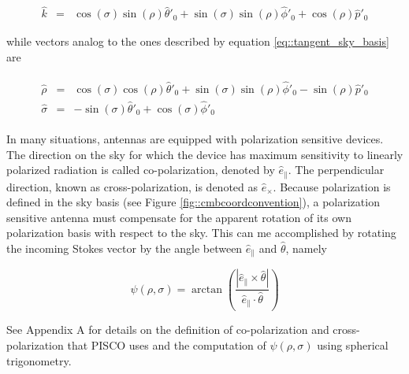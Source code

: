 \documentclass[a4paper,fleqn]{cas-dc}\sloppy
\newcommand{\co}{\mathbin{\|}}
\newcommand{\cx}{\mathbin{\times}}
\begin{document}
	\begin{equation}
	\begin{aligned}
	\hat{k}       &=&  \cos(\sigma)\sin(\rho)\hat{\theta}'_0 + \sin(\sigma)\sin(\rho) \hat{\phi}'_0 + \cos(\rho) \hat{p}'_0 
	\end{aligned}
	\end{equation}
	
	\noindent
	while vectors analog to the ones described by equation \ref{eq::tangent_sky_basis} are
	
	\begin{eqnarray}
	\begin{aligned}
	\hat{\rho}    &=&  \cos(\sigma)\cos(\rho)\hat{\theta}'_0 + \sin(\sigma)\sin(\rho) \hat{\phi}'_0 - \sin(\rho) \hat{p}'_0 \\
	\hat{\sigma}  &=& -\sin(\sigma)\hat{\theta}'_0 + \cos(\sigma)\hat{\phi}'_0
	\end{aligned}
	\end{eqnarray}
	
	In many situations, antennas are equipped with polarization sensitive devices. The direction on the sky for which the device has maximum sensitivity to linearly polarized radiation is called co-polarization, denoted by $\hat{e}_{\co}$. The perpendicular direction, known as cross-polarization, is denoted as $\hat{e}_{\cx}$.
	Because polarization is defined in the sky basis (see Figure \ref{fig::cmbcoordconvention}), a polarization sensitive antenna must compensate for the apparent rotation of its own polarization basis with respect to the sky. This can me accomplished by rotating the incoming Stokes vector by the angle between $\hat{e}_{\co}$ and $\hat{\theta}$, namely
	
	\begin{equation}
	\psi(\rho,\sigma) = \arctan \left( \frac{ |\hat{e}_{\co} \times \hat{\theta}| }{ \hat{e}_{\co} \cdot \hat{\theta} } \right)
	\label{eq::psi}
	\end{equation}

	See Appendix A for details on the definition of co-polarization and cross-polarization that PISCO uses and the computation of $\psi(\rho,\sigma)$ using spherical trigonometry.
	
\end{document}
